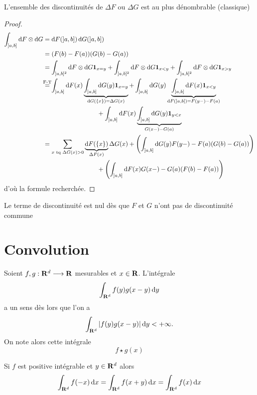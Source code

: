 \begin{rem}
    L'ensemble des discontinuités de $\Delta F$ ou  $\Delta G$ est au plus dénombrable (classique)
\end{rem}

\begin{proof}
    \begin{align*}\int_{]a, b]}\diff F\otimes \diff G&=\diff F(]a, b])\diff G(]a, b])\\&=(F(b)-F(a))(G(b)-G(a))\\&=\int_{]a, b]^2}\diff F\otimes \diff G\1_{x=y}+\int_{]a, b]^2}\diff F\otimes \diff G\1_{x<y}+\int_{]a, b]^2}\diff F\otimes \diff G\1_{x>y} \\ &\overset{\mathclap{\text{F-T}}}=\int_{]a, b]}\diff F(x)\underbrace{\int_{]a, b]}\diff G(y)\1_{x=y}}_{\diff G( \left\{ x \right\} )=\Delta G(x)}+ \int_{]a, b]}\diff G(y)\underbrace{\int_{]a, b]}\diff F(x)\1_{x<y}}_{\diff F(]a, b])=F(y-)-F(a)}\\&\hspace{3cm} +\int_{]a, b]}\diff F(x)\underbrace{\int_{]a, b]}\diff G(y)\1_{y<x}}_{G(x-)-G(a)} \\ &= \sum_{x \text{ tq }\Delta G(x)>0}\underbrace{\diff F( \left\{ x \right\}  )}_{\Delta F(x)} \Delta G(x) + \left(\int_{]a,b]}\diff G(y)F(y-)-F(a)(G(b)-G(a))\right) \\ &\hspace{3cm}+\left(\int_{]a,b]}\diff F(x)G(x-)-G(a)(F(b)-F(a))\right)
    \end{align*}
    d'où la formule recherchée.
\end{proof}

\begin{rem}
Le terme de discontinuité est nul dès que $F$ et  $G$ n'ont pas de discontinuité commune
\end{rem}

\section{Convolution}


Soient $f, g : \mathbf R^d \longrightarrow  \mathbf R$ mesurables et $x \in  \mathbf R$. L'intégrale \[\int_{\mathbf R^d}f(y)g(x-y)\mathop{}\!\mathrm d y\] a un sens dès lors que l'on a \[\int_{\mathbf R^d}|f(y) g(x-y)|\mathop{}\!\mathrm d y<+\infty.\] On note alors cette intégrale \[f\star g(x)\]

\begin{lmm}
    Si $f$ est positive intégrable et  $y \in  \mathbf R^d$ alors \[\int_{\mathbf R^d} f(-x)\mathop{}\!\mathrm d x=\int_{\mathbf R^d}f(x+y)\mathop{}\!\mathrm d x=\int_{\mathbf R^d}f(x)\mathop{}\!\mathrm d x\]
\end{lmm}

